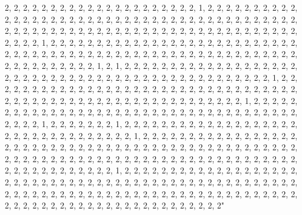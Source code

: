 \documentclass[
]{article}
\begin{document}
\begin{Schunk}
\begin{Soutput}
2, 2, 2, 2, 2, 2, 2, 2, 2, 2, 2, 2, 2, 2, 2, 2, 2, 2, 2, 2, 2, 1, 2, 2, 2, 2, 2, 2, 2, 2, 2, 2, 2, 2, 2, 2, 2, 2, 2, 2, 2, 2, 2, 2, 2, 2, 2, 2, 2, 2, 2, 2, 2, 2, 2, 2, 2, 2, 2, 2, 2, 2, 2, 2, 2, 2, 2, 2, 2, 2, 2, 2, 2, 2, 2, 2, 2, 2, 2, 2, 2, 2, 2, 2, 2, 2, 2, 2, 2, 2, 2, 2, 2, 2, 2, 2, 2, 2, 2, 2, 1, 2, 2, 2, 2, 2, 2, 2, 2, 2, 2, 2, 2, 2, 2, 2, 2, 2, 2, 2, 2, 2, 2, 2, 2, 2, 2, 2, 2, 2, 2, 2, 2, 2, 2, 2, 2, 2, 2, 2, 2, 2, 2, 2, 2, 2, 2, 2, 2, 2, 2, 2, 2, 2, 2, 2, 2, 2, 2, 2, 2, 2, 2, 2, 2, 2, 2, 2, 2, 2, 1, 2, 1, 2, 2, 2, 2, 2, 2, 2, 2, 2, 2, 2, 2, 2, 2, 2, 2, 2, 2, 2, 2, 2, 2, 2, 2, 2, 2, 2, 2, 2, 2, 2, 2, 2, 2, 2, 2, 2, 2, 2, 2, 2, 2, 2, 2, 2, 2, 2, 2, 1, 2, 2, 2, 2, 2, 2, 2, 2, 2, 2, 2, 2, 2, 2, 2, 2, 2, 2, 2, 2, 2, 2, 2, 2, 2, 2, 2, 2, 2, 2, 2, 2, 2, 2, 2, 2, 2, 2, 2, 2, 2, 2, 2, 2, 2, 2, 2, 2, 2, 2, 2, 2, 2, 2, 2, 2, 2, 2, 2, 2, 1, 2, 2, 2, 2, 2, 2, 2, 2, 2, 2, 2, 2, 2, 2, 2, 2, 2, 2, 2, 2, 2, 2, 2, 2, 2, 2, 2, 2, 2, 2, 2, 2, 2, 2, 2, 2, 2, 2, 2, 2, 2, 1, 2, 2, 2, 2, 2, 2, 2, 1, 2, 2, 2, 2, 2, 2, 2, 2, 2, 2, 2, 2, 2, 2, 2, 2, 2, 2, 2, 2, 2, 2, 2, 2, 2, 2, 2, 2, 2, 2, 2, 2, 2, 1, 2, 2, 2, 2, 2, 2, 2, 2, 2, 2, 2, 2, 2, 2, 2, 2, 2, 2, 2, 2, 2, 2, 2, 2, 2, 2, 2, 2, 2, 2, 2, 2, 2, 2, 2, 2, 2, 2, 2, 2, 2, 2, 2, 2, 2, 2, 2, 2, 2, 2, 2, 2, 2, 2, 2, 2, 2, 2, 2, 2, 2, 2, 2, 2, 2, 2, 2, 2, 2, 2, 2, 2, 2, 2, 2, 2, 2, 2, 2, 2, 2, 2, 2, 2, 2, 2, 2, 2, 2, 2, 2, 2, 2, 1, 2, 2, 2, 2, 2, 2, 2, 2, 2, 2, 2, 2, 2, 2, 2, 2, 2, 2, 2, 2, 2, 2, 2, 2, 2, 2, 2, 2, 2, 2, 2, 2, 2, 2, 2, 2, 2, 2, 2, 2, 2, 2, 2, 2, 2, 2, 2, 2, 2, 2, 2, 2, 2, 2, 2, 2, 2, 2, 2, 2, 2, 2, 2, 2, 2, 2, 2, 2, 2, 2, 2, 2, 2, 2, 2, 2, 2, 2, 2, 2, 2, 2, 2, 2, 2, 2, 2, 2, 2, 2, 2, 2, 2, 2, 2, 2, 2, 2, 2, 2, 2, 2, 2, 2, 2, 2, 2" 

\end{Soutput}
\end{Schunk}
\end{document}

